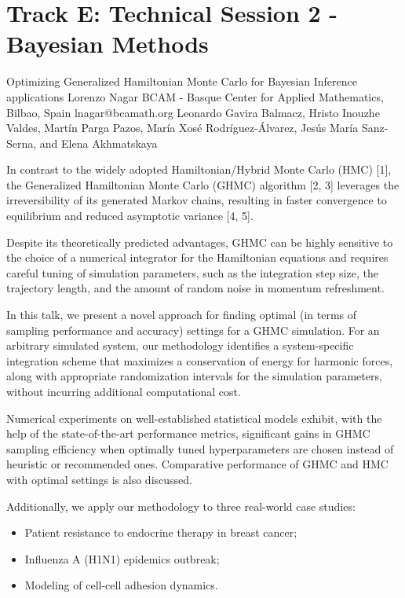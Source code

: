 \section{Track E: Technical Session 2 - Bayesian Methods}\newpage

\begin{talk}
  {Optimizing Generalized Hamiltonian Monte Carlo for Bayesian Inference applications}%
  {Lorenzo Nagar}%
  {BCAM - Basque Center for Applied Mathematics, Bilbao, Spain}%
  {lnagar@bcamath.org}%
  {Leonardo Gavira Balmacz, Hristo Inouzhe Valdes, Mart\'in Parga Pazos, Mar\'ia Xos\'e Rodr\'iguez-\'Alvarez, Jes\'us Mar\'ia Sanz-Serna, and Elena Akhmatskaya}%
  
    
   
In contrast to the widely adopted Hamiltonian/Hybrid Monte Carlo (HMC) [1], the Generalized Hamiltonian Monte Carlo (GHMC) algorithm [2, 3] leverages the irreversibility of its generated Markov chains, resulting in faster convergence to equilibrium and reduced asymptotic variance [4, 5]. 

Despite its theoretically predicted advantages, GHMC can be highly sensitive to the choice of a numerical integrator for the Hamiltonian equations and requires careful tuning of simulation parameters, such as the integration step size, the trajectory length, and the amount of random noise in momentum refreshment.

In this talk, we present a novel approach for finding optimal (in terms of sampling performance and accuracy) settings for a GHMC simulation. For an arbitrary simulated system, our methodology identifies a system-specific integration scheme that maximizes a conservation of energy for harmonic forces, along with appropriate randomization intervals for the simulation parameters, without incurring additional computational cost.

Numerical experiments on well-established statistical models exhibit, with the help of the state-of-the-art performance metrics, significant gains in GHMC sampling efficiency when optimally tuned hyperparameters are chosen instead of heuristic or recommended ones. Comparative performance of GHMC and HMC with optimal settings is also discussed. 

Additionally, we apply our methodology to three real-world case studies:
\begin{itemize}
\item Patient resistance to endocrine therapy in breast cancer;
\item Influenza A (H1N1) epidemics outbreak;
\item Modeling of cell-cell adhesion dynamics.
\end{itemize}


\end{talk}
